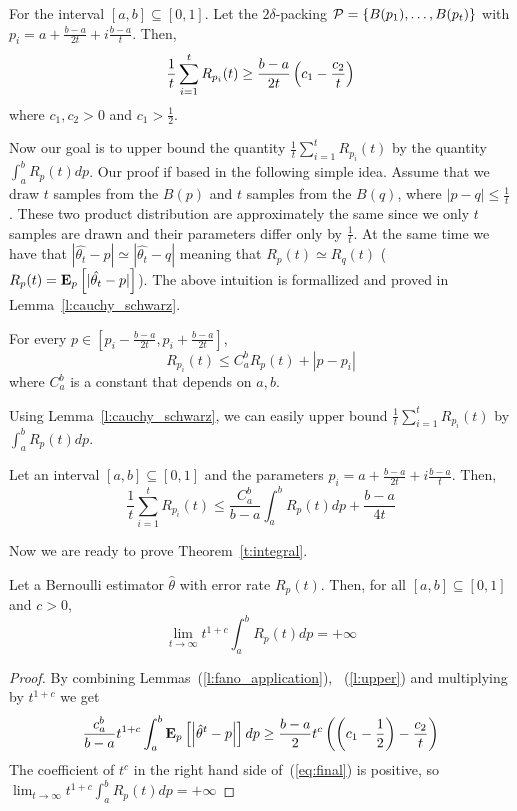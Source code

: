 \begin{lemma}\label{l:fano_application}
For the interval $[a,b] \subseteq [0,1]$. Let the $2\delta$-packing $\P=\{B(p_1),\ldots,B(p_t)\}$ with $p_i = a+\frac{b-a}{2t} + i \frac{b-a}{t}$. Then,
\[\frac{1}{t} \sum_{i=1}^t R_{p_i}(t) \geq \frac{b-a}{2t} \lp(c_1 - \frac{c_2}{t}\rp)\]
where $c_1, c_2 >0$ and $c_1 > \frac{1}{2}$.
\end{lemma}

\noindent Now our goal is to upper bound the quantity $\frac{1}{t} \sum_{i=1}^{t} R_{p_i}(t)$ by the quantity $\int_{a}^b R_p(t)dp$.
Our proof if based in the following simple idea. Assume that we draw $t$ samples from the $B(p)$ and $t$ samples
from the $B(q)$, where $|p-q|\leq \frac{1}{t}$. These two product distribution are approximately the same since
we only $t$ samples are drawn and their parameters differ only by $\frac{1}{t}$. At the same time we have that
$|\hat{\theta_t}-p| \simeq |\hat{\theta_t}-q|$ meaning that $R_p(t)\simeq R_q(t)$ ($R_p(t)=\Expnew{p}{|\hat{\theta_t}-p|}$).
The above intuition is formallized and proved in Lemma~\ref{l:cauchy_schwarz}.

\begin{lemma}\label{l:cauchy_schwarz}
For every $p\in [p_i -\frac{b-a}{2t},p_i + \frac{b-a}{2t}]$,
\[R_{p_i}(t) \leq C_a^b R_{p}(t) +  |p-p_i|\]
where $C_a^b$ is a constant that depends on $a,b$.
 \end{lemma}
\noindent Using Lemma~\ref{l:cauchy_schwarz}, we can easily upper bound $\frac{1}{t} \sum_{i=1}^{t} R_{p_i}(t)$ by $\int_{a}^b R_p(t)dp$.

\begin{lemma}\label{l:upper}
Let an interval $[a,b] \subseteq [0,1]$ and the parameters $p_i = a+\frac{b-a}{2t} + i \frac{b-a}{t}$. Then,
\[ \frac{1}{t} \sum_{i=1}^{t} R_{p_i}(t) \leq \frac{C_a^b}{b-a} \int_a^b R_p(t) dp + \frac{b-a}{4t}\]
\end{lemma}
\noindent Now we are ready to prove Theorem~\ref{t:integral}.

\begin{theorem}
Let a Bernoulli estimator $\hat{\theta}$ with error rate $R_p(t)$. Then, for all $[a,b] \subseteq [0,1]$ and $c>0$,
\[ \lim_{t \to \infty}t^{1+c} \int_{a}^{b}R_p(t)dp = +\infty\]
\end{theorem}
\begin{proof}
By combining Lemmas~(\ref{l:fano_application}), ~(\ref{l:upper}) and multiplying by $t^{1+c}$ we get
\begin{equation*}\label{eq:final}
\frac{c_a^b}{b-a}t^{1+c} \int_a^b \Expnew{p}{\lp|\hat{\theta}^t-p\rp|}dp \geq \frac{b-a}{2}t^c\lp(\lp(c_1 - \frac{1}{2}\rp)- \frac{c_2}{t}\rp)
\end{equation*}
The coefficient of $t^c$ in the right hand side of~(\ref{eq:final}) is positive, so $\lim_{t\to\infty} t^{1+c}\int_{a}^b R_p(t)dp = +\infty$
\end{proof}
